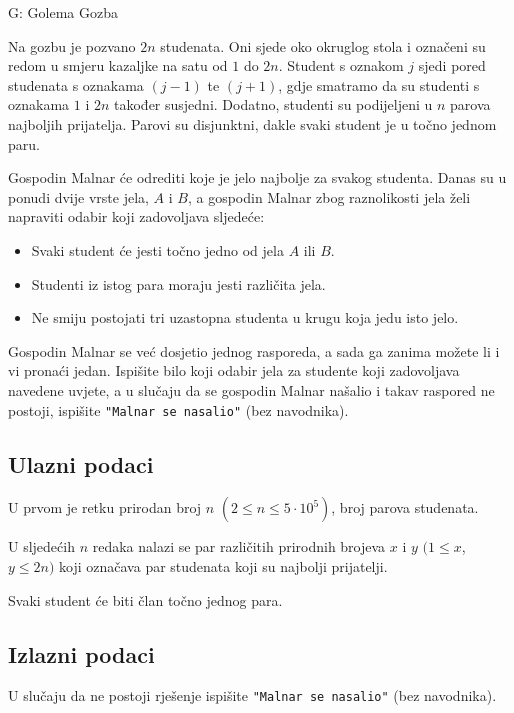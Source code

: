 \begin{statement}[
  timelimit=2 s,
  memorylimit=512 MiB,
]{G: Golema Gozba}

Na gozbu je pozvano $2n$ studenata. Oni sjede oko okruglog stola i označeni su
redom u smjeru kazaljke na satu od $1$ do $2n$. Student s oznakom $j$ sjedi
pored studenata s oznakama $(j - 1)$ te $(j + 1)$, gdje smatramo da su studenti
s oznakama $1$ i $2n$ također susjedni. Dodatno, studenti su podijeljeni u $n$
parova najboljih prijatelja. Parovi su disjunktni, dakle svaki student je u
točno jednom paru.

Gospodin Malnar će odrediti koje je jelo najbolje za svakog studenta. Danas su
u ponudi dvije vrste jela, $A$ i $B$, a gospodin Malnar zbog raznolikosti jela
želi napraviti odabir koji zadovoljava sljedeće:
\begin{itemize}
    \item Svaki student će jesti točno jedno od jela $A$ ili $B$.
    \item Studenti iz istog para moraju jesti različita jela.
    \item Ne smiju postojati tri uzastopna studenta u krugu koja jedu isto jelo.
\end{itemize}

Gospodin Malnar se već dosjetio jednog rasporeda, a sada ga zanima možete li i
vi pronaći jedan. Ispišite bilo koji odabir jela za studente koji zadovoljava
navedene uvjete, a u slučaju da se gospodin Malnar našalio i takav raspored ne
postoji, ispišite \texttt{"Malnar se nasalio"} (bez navodnika).

\subsection*{Ulazni podaci}
U prvom je retku prirodan broj $n$ $(2 \le n \le 5 \cdot 10^5)$, broj parova
studenata.

U sljedećih $n$ redaka nalazi se par različitih prirodnih brojeva $x$ i $y$
$(1 \le x$, $y \le 2n)$ koji označava par studenata koji su najbolji prijatelji.

Svaki student će biti član točno jednog para.
\subsection*{Izlazni podaci}
U slučaju da ne postoji rješenje ispišite \texttt{"Malnar se nasalio"}
(bez navodnika).


\end{statement}
